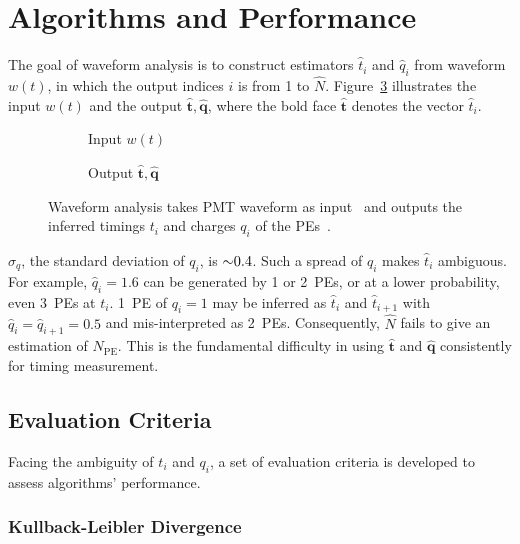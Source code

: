 \section{Algorithms and Performance} %
\label{sec:algorithm}

The goal of waveform analysis is to construct estimators $\hat{t}_i$ and $\hat{q}_i$ from waveform $w(t)$, in which the output indices $i$ is from 1 to $\hat{N}$.  Figure~\ref{fig:io} illustrates the input $w(t)$ and the output $\bm{\hat{t}}, \bm{\hat{q}}$, where the bold face $\bm{\hat{t}}$ denotes the vector $\hat{t}_i$.
\begin{figure}[H]
  \centering
  \begin{subfigure}{.45\textwidth}
    \resizebox{\textwidth}{!}{}
    \caption{\label{fig:input} Input $w(t)$}
  \end{subfigure}
  \begin{subfigure}{.45\textwidth}
    \resizebox{\textwidth}{!}{}
    \caption{\label{fig:output} Output $\bm{\hat{t}}, \bm{\hat{q}}$}
  \end{subfigure}
  \caption{\label{fig:io}Waveform analysis takes PMT waveform as input~ and outputs the inferred timings $t_i$ and charges $q_i$ of the PEs~.}
\end{figure}

$\sigma_q$, the standard deviation of $q_i$, is $\num{\sim 0.4}$.  Such a spread of $q_i$ makes $\hat{t}_i$ ambiguous. For example, $\hat{q}_i=1.6$ can be generated by 1 or 2~PEs, or at a lower probability, even 3~PEs at $t_i$. 1~PE of $q_i=1$ may be inferred as $\hat{t}_i$ and $\hat{t}_{i+1}$ with $\hat{q}_i=\hat{q}_{i+1}=0.5$ and mis-interpreted as 2~PEs.  Consequently, $\hat{N}$ fails to give an estimation of $N_\mathrm{PE}$.  This is the fundamental difficulty in using $\bm{\hat{t}}$ and $\bm{\hat{q}}$ consistently for timing measurement.

\subsection{Evaluation Criteria}
\label{sec:criteria}
Facing the ambiguity of $t_i$ and $q_i$, a set of evaluation criteria is developed to assess algorithms' performance. 

\subsubsection{Kullback-Leibler Divergence}
\label{sec:pseudo}


